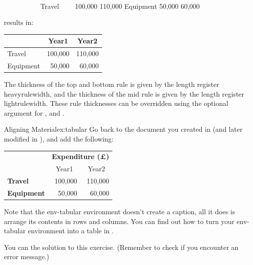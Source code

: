\begin{code}
\newline
{}\newline
\strut~~~~~~~~~~
\newline
\strut~~~~~~~~~~
%
\newline
{}\newline
Travel~~~~ 100,000 
110,000\newline
Equipment  50,000   60,000%
\newline
{}\newline
{}
\end{code}
results in:
\begin{result}
\begin{tabular}{lrr}
\toprule
          & \multicolumn{1}{c}{Year1} 
          & \multicolumn{1}{c}{Year2} \\
\midrule
Travel    & 100,000 & 110,000\\
Equipment & 50,000  & 60,000
\\\bottomrule
\end{tabular}
\end{result}

The thickness of the top and bottom rule is given by
the \gls{length} register \booklinebreak\gls{heavyrulewidth}, and the thickness of
the mid rule is given by the \gls{length} register
\gls{lightrulewidth}. These rule thicknesses can be overridden using the
optional argument  for , 
and .

\begin{exercise}{Aligning Material}{ex:tabular}
Go back to the document you created in  (and later modified in ),
and add the following: 
\begin{result}
\begin{tabular}{lrr}
 & \multicolumn{2}{c}{\bfseries Expenditure (\pounds)}\\
 & \multicolumn{1}{c}{Year1} & \multicolumn{1}{c}{Year2} \\
\bfseries Travel & 100,000 & 110,000\\
\bfseries Equipment & 50,000 & 60,000
\end{tabular}
\end{result}

Note that the \gls{env-tabular} environment
doesn't create a caption, all it does is arrange its contents in
rows and columns. You can find out how to turn your
\gls{env-tabular} environment into a table 
in .

You can  the solution to this exercise. (Remember to check
 if you encounter an error message.)
\end{exercise}

